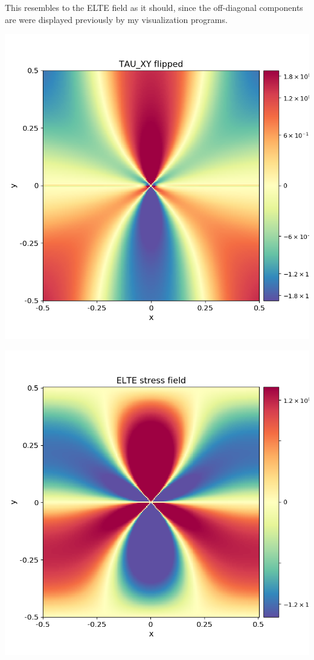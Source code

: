 \documentclass[12pt,a4paper]{article}
\theoremstyle{plain}
\begin{document}
\begin{multicols*}{2}
	\par This resembles to the ELTE field as it should, since the off-diagonal
	components are were displayed previously by my visualization programs.

	\begin{minipage}[t]{0.42\columnwidth}
		\centering
		\includegraphics[width=0.8\columnwidth]{elte_stress_field_TAU_XY_flipped.png}
	\end{minipage}
	\begin{minipage}[t]{0.42\columnwidth}
		\centering
		\includegraphics[width=0.8\columnwidth]{elte_stress_field.png}
	\end{minipage}


\end{multicols*}
\end{document}
